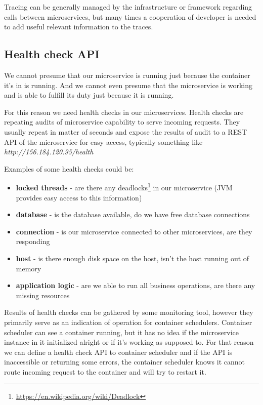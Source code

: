 \documentclass[12pt,oneside]{fithesis2}
\begin{document}
Tracing can be generally managed by the infrastructure or framework regarding calls between microservices, but many times a cooperation of developer is needed to add useful relevant information to the traces.

\subsection{Health check API}
We cannot presume that our microservice is running just because the container it's in is running. And we cannot even presume that the microservice is working and is able to fulfill its duty just because it is running. 

For this reason we need health checks in our microservices. Health checks are repeating audits of microservice capability to serve incoming requests. They usually repeat in matter of seconds and expose the results of audit to a REST API of the microservice for easy access, typically something like \textit{http://156.184.120.95/health}

Examples of some health checks could be:
\begin{itemize}
\item \textbf{locked threads} - are there any deadlocks\footnote{\url{https://en.wikipedia.org/wiki/Deadlock}} in our microservice (JVM provides easy access to this information)
\item \textbf{database} - is the database available, do we have free database connections
\item \textbf{connection} - is our microservice connected to other microservices, are they responding
\item \textbf{host} - is there enough disk space on the host, isn't the host running out of memory
\item \textbf{application logic} - are we able to run all business operations, are there any missing resources
\end{itemize}

Results of health checks can be gathered by some monitoring tool, however they primarily serve as an indication of operation for container schedulers. Container scheduler can see a container running, but it has no idea if the microservice instance in it initialized alright or if it's working as supposed to. For that reason we can define a health check API to container scheduler and if the API is inaccessible or returning some errors, the container scheduler knows it cannot route incoming request to the container and will try to restart it.
\end{document}
